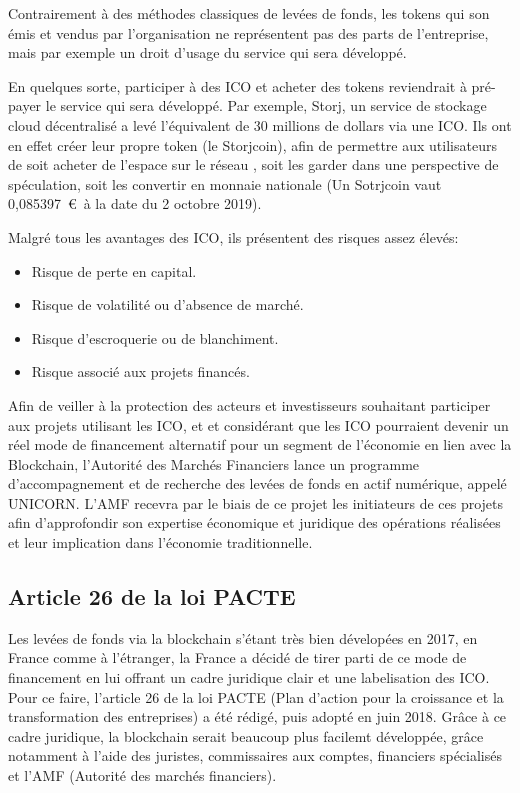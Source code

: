 \documentclass[12pt, a4paper, oneside]{book}
\begin{document}
    Contrairement à des méthodes classiques de levées de fonds, les tokens qui son émis et vendus par l'organisation ne représentent pas des parts
    de l'entreprise, mais par exemple un droit d'usage du service qui sera développé.

    En quelques sorte, participer à des ICO et acheter des tokens reviendrait à pré-payer le service qui sera développé.
    Par exemple, Storj, un service de stockage cloud décentralisé a levé l'équivalent de 30 millions de dollars via une ICO. 
    Ils ont en effet créer leur propre token (le Storjcoin), afin de permettre aux utilisateurs de soit acheter de l'espace sur le réseau , soit les garder dans 
    une perspective de spéculation, soit les convertir en monnaie nationale (Un Sotrjcoin vaut 0,085397~\euro~à la date du 2 octobre 2019).

    Malgré tous les avantages des ICO, ils présentent des risques assez élevés:
    \begin{itemize}
        \item Risque de perte en capital.
        \item Risque de volatilité ou d'absence de marché.
        \item Risque d'escroquerie ou de blanchiment.
        \item Risque associé aux projets financés.
    \end{itemize}

    Afin de veiller à la protection des acteurs et investisseurs souhaitant participer
    aux projets utilisant les ICO, et et considérant que les ICO pourraient devenir un réel mode de financement alternatif
    pour un segment de l'économie en lien avec la Blockchain, l'Autorité des Marchés Financiers
    lance un programme d'accompagnement et de recherche des levées de fonds en actif numérique, appelé UNICORN.
    L'AMF recevra par le biais de ce projet les initiateurs de ces projets afin d'approfondir son expertise économique et juridique
    des opérations réalisées et leur implication dans l'économie traditionnelle.
    \cite{unicorn}
    
    \subsection{Article 26 de la loi PACTE}

    Les levées de fonds via la blockchain s'étant très bien dévelopées en 2017, en France comme à l'étranger, 
    la France a décidé de tirer parti de ce mode de financement en lui offrant un cadre juridique clair et une labelisation des ICO.
    Pour ce faire, l'article 26 de la loi PACTE (Plan d'action pour la croissance et la transformation des entreprises) a été rédigé, puis adopté en juin 2018. 
    Grâce à ce cadre juridique, la blockchain serait beaucoup plus facilemt développée, grâce notamment à l'aide des juristes, commissaires aux comptes, 
    financiers spécialisés et l'AMF (Autorité des marchés financiers).
    \cite{art26ico}
\end{document}

